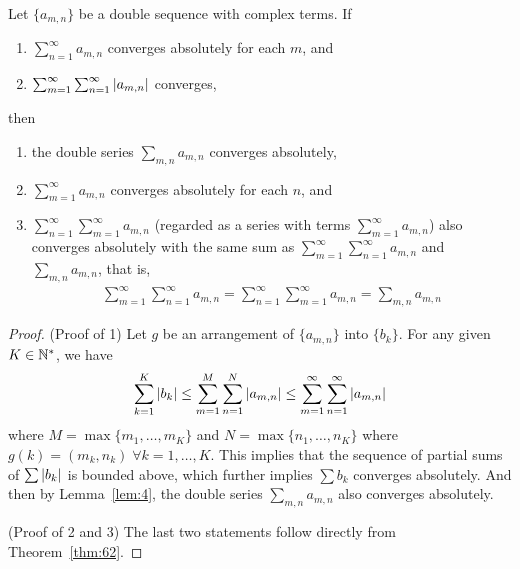 \documentclass[thmcnt=section, 12pt]{my-elegantbook}
\begin{document}
\begin{theorem} \label{thm:61}
    Let $\{a_{m,n}\}$ be a double sequence with complex terms. If
    \begin{enumerate}[label=\textcolor{structurecolor}{\alph*.}]
        \item $\sum_{n=1}^\infty a_{m,n}$ converges absolutely for each $m$, and
        \item $\sum_{m=1}^\infty \sum_{n=1}^\infty \left\lvert a_{m,n} \right\rvert$ converges,
    \end{enumerate}
    then
    \begin{enumerate}
        \item the double series $\sum_{m,n} a_{m,n}$ converges absolutely,
        \item $\sum_{m=1}^\infty a_{m,n}$ converges absolutely for each $n$, and
        \item $\sum_{n=1}^\infty \sum_{m=1}^\infty a_{m,n}$ (regarded as a series with terms $\sum_{m=1}^\infty a_{m,n}$) also converges absolutely with the same sum as $\sum_{m=1}^\infty \sum_{n=1}^\infty a_{m,n}$ and $\sum_{m,n} a_{m,n}$, that is,
              \begin{align*}
                  \sum_{m=1}^\infty \sum_{n=1}^\infty a_{m,n}
                  = \sum_{n=1}^\infty \sum_{m=1}^\infty a_{m,n}
                  = \sum_{m, n} a_{m,n}
              \end{align*}
    \end{enumerate}
\end{theorem}

\begin{proof}
    (Proof of 1) Let $g$ be an arrangement of $\{ a_{m,n} \}$ into $\{b_k\}$. For any given $K \in \mathbb{N}^\ast$, we have
    \begin{align*}
        \sum_{k=1}^K \left\lvert b_k \right\rvert
        \leq \sum_{m=1}^M \sum_{n=1}^N \left\lvert a_{m,n} \right\rvert
        \leq \sum_{m=1}^\infty \sum_{n=1}^\infty \left\lvert a_{m,n} \right\rvert
    \end{align*}
    where $M = \max \{m_1, \ldots, m_K\}$ and $N = \max \{n_1, \ldots, n_K\}$ where $g(k) = (m_k, n_k) \; \forall k = 1, \ldots, K$. This implies that the sequence of partial sums of $\sum \left\lvert b_k \right\rvert$ is bounded above, which further implies $\sum b_k$ converges absolutely. And then by Lemma~\ref{lem:4}, the double series $\sum_{m,n} a_{m,n}$ also converges absolutely.

    (Proof of 2 and 3) The last two statements follow directly from Theorem~\ref{thm:62}.
\end{proof}
\end{document}
